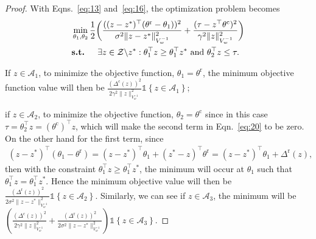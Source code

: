 \documentclass[accepted]{uai2025} %
\theoremstyle{plain}
\theoremstyle{definition}
\theoremstyle{remark}
\newcommand{\thetac}{\theta^{\mathrm{c}}}
\newcommand{\Deltac}{\Delta^{\mathrm{c}}}
\newcommand{\Deltar}{\Delta^{\mathrm{r}}}
\newcommand{\thetar}{\theta^{\mathrm{r}}}
\newcommand{\cbr}[1]{\left\{#1\right\}}
\newcommand*{\one}{\mathds{1}}
\begin{document}
\begin{proof}
With Eqns.~\eqref{eq:13} and~\eqref{eq:16}, %
the optimization problem becomes
\begin{align}
        &\min_{\theta_1, \theta_2} \frac{1}{2} \bigg(  \frac{((z-z^*)^\top (\thetar-\theta_1))^2}{\sigma^2 \lVert z-z^* \rVert^2_{V_w^{-1}}}+\frac{(\tau-z^\top \thetac)^2}{\gamma^2\lVert z \rVert^2_{V_w^{-1}}}\bigg)\label{eq:20}
        \\&\textbf{s.t. }\quad \exists z\in \mathcal{Z}\backslash z^*: \theta_1^\top z\ge \theta_1^\top z^* \mbox{ and } \theta_2^\top z \le \tau. \notag
    \end{align}

If $z\in\mathcal{A}_1$, to minimize the objective function, $\theta_1=\thetar$, the minimum objective function  value will then be $\frac{(\Deltac(z))^2}{2\gamma^2\lVert z\rVert^2_{V_w^{-1}}} \one \cbr{z\in \mathcal{A}_1}$;

if $z\in\mathcal{A}_2$, to minimize the objective function, $\theta_2=\thetac$ since in this case $\tau=\theta_2^\top z=(\thetac)^\top z$, which will make the second term in Eqn.~\eqref{eq:20} to be zero. On the other hand for the first term, since
\begin{align*}
    (z-z^*)^\top (\theta_1-\thetar)=(z-z^*)^\top \theta_1+(z^*-z)^\top \thetar=(z-z^*)^\top \theta_1+\Deltar(z),
\end{align*}
then with the constraint $\theta_1^\top z\ge \theta_1^\top z^*$, the minimum will occur at $\theta_1$ such that $\theta_1^\top z= \theta_1^\top z^*$. Hence the minimum objective value will then be $\frac{(\Deltar(z))^2}{2\sigma^2\lVert z-z^* \rVert^2_{V_w^{-1}}} \one \cbr{z\in \mathcal{A}_2}$.
Similarly, we can see if $z\in\mathcal{A}_3$, the minimum will be $( \frac{(\Deltac(z))^2}{2\gamma^2\lVert z\rVert^2_{V_w^{-1}}}+\frac{(\Deltar(z))^2}{2\sigma^2\lVert z-z^*\rVert^2_{V_w^{-1}}}) \one \cbr{z\in \mathcal{A}_3}$.


\end{proof}
\end{document}
